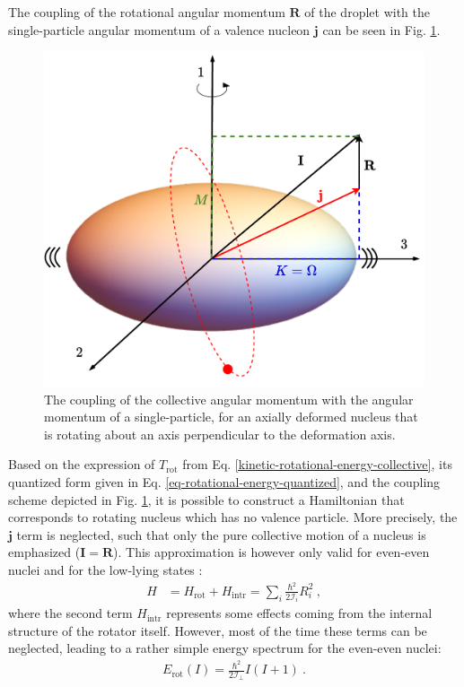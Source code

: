 The coupling of the rotational angular momentum $\mathbf{R}$ of the droplet with the single-particle angular momentum of a valence nucleon $\mathbf{j}$ can be seen in Fig. \ref{rotational-coupling-schematic}.
\begin{figure}
    \centering
    \includegraphics[scale=0.5]{Chapters/Figures/SCHEMATIC_COUPLING_ROTATIONAL.pdf}
    \caption{The coupling of the collective angular momentum with the angular momentum of a single-particle, for an axially deformed nucleus that is rotating about an axis perpendicular to the deformation axis.}
    \label{rotational-coupling-schematic}
\end{figure}

Based on the expression of $T_\text{rot}$ from Eq. \ref{kinetic-rotational-energy-collective}, its quantized form given in Eq. \ref{eq-rotational-energy-quantized}, and the coupling scheme depicted in Fig. \ref{rotational-coupling-schematic}, it is possible to construct a Hamiltonian that corresponds to rotating nucleus which has no valence particle. More precisely, the $\mathbf{j}$ term is neglected, such that only the pure collective motion of a nucleus is emphasized ($\mathbf{I}=\mathbf{R}$). This approximation is however only valid for even-even nuclei and for the low-lying states \cite{bertulani2007nuclear,davydov1958rotational}:
\begin{align}
    H&=H_\text{rot}+H_\text{intr}=\sum_i\frac{\hbar^2}{2\mathcal{I}_i}R_i^2\ ,
\end{align}
where the second term $H_\text{intr}$ represents some effects coming from the internal structure of the rotator itself. However, most of the time these terms can be neglected, leading to a rather simple energy spectrum for the even-even nuclei:
\begin{align}
    E_\text{rot}(I)=\frac{\hbar^2}{2\mathcal{I}_\perp}I(I+1)\ .
    \label{eq-simple-rotor-spectrum}
\end{align}

